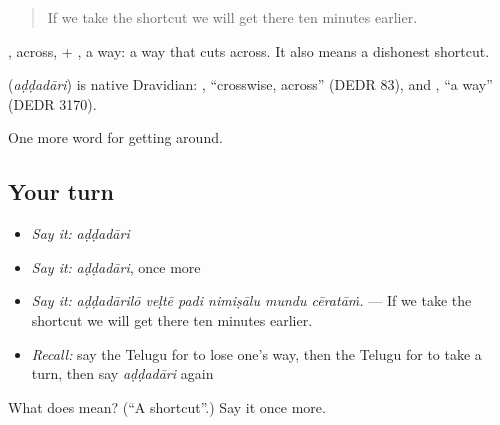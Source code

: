 \begin{quote}
If we take the shortcut we will get there ten minutes earlier.
\end{quote}

, across, + , a way: a way that cuts across. It also means a dishonest shortcut.

\begin{cousinweb}
\textbf{} (\emph{aḍḍadāri}) is native Dravidian: , \textquotedblleft{}crosswise, across\textquotedblright{} (DEDR 83), and , \textquotedblleft{}a way\textquotedblright{} (DEDR 3170).
\end{cousinweb}

\begin{grammarlens}[title={What you've built}]
One more word for getting around.
\end{grammarlens}

\subsection*{Your turn}
\begin{itemize}
\raggedright
  \item \emph{Say it:} \emph{aḍḍadāri}
  \item \emph{Say it:} \emph{aḍḍadāri}, once more
  \item \emph{Say it:} \emph{aḍḍadārilō veḷtē padi nimiṣālu mundu cēratāṁ.} — If we take the shortcut we will get there ten minutes earlier.
  \item \emph{Recall:} say the Telugu for to lose one's way, then the Telugu for to take a turn, then say \emph{aḍḍadāri} again
\end{itemize}

\begin{tcolorbox}[breakable,colback=teal!4,colframe=teal!35!black,title={Before you move on}]
What does  mean? (\textquotedblleft{}A shortcut\textquotedblright{}.) Say it once more.
\end{tcolorbox}

